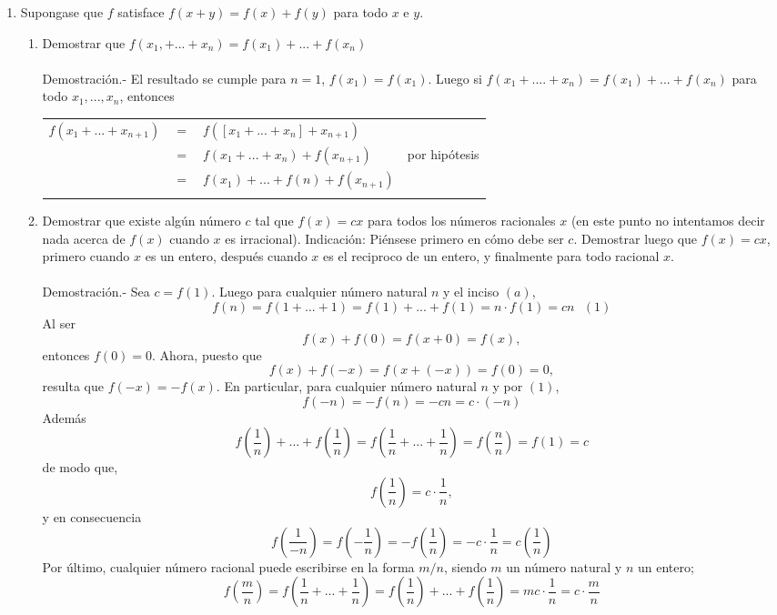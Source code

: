 \begin{enumerate}
\begin{enumerate}[\bfseries (a)]
	\end{enumerate}

	\item Supongase que $f$ satisface $f(x+y)=f(x)+f(y)$ para todo $x$ e $y$. 

	\begin{enumerate}[\bfseries (a)]

	    \item Demostrar que $f(x_1,+...+x_n)=f(x_1)+...+f(x_n)$\\\\
	    Demostración.-\; El resultado se cumple para $n=1$, $f(x_1)=f(x_1)$. Luego si $f(x_1 + .... + x_n)=f(x_1)+ ... + f(x_n)$ para todo $x_1,...,x_n$, entonces
	    \begin{center}
		\begin{tabular}{rcll}
		    $f(x_1 + ... + x_{n+1})$ & $=$ & $f(\left[x_1 + ... + x_n\right]+x_{n+1})$&\\
		       & $=$ & $f(x_1 + ... + x_n) + f(x_{n+1})$&por hipótesis\\
		       & $=$ & $f(x_1)+...+f(n)+f(x_{n+1})$&\\\\
		\end{tabular}
	    \end{center}

	    \item Demostrar que existe algún número $c$ tal que $f(x)=cx$ para todos los números racionales $x$ (en este punto no intentamos decir nada acerca de $f(x)$ cuando $x$ es irracional). Indicación: Piénsese primero en cómo debe ser $c$. Demostrar luego que $f(x)=cx$, primero cuando $x$ es un entero, después cuando $x$ es el reciproco de un entero, y finalmente para todo racional $x$.\\\\
	    Demostración.-\; Sea $c=f(1)$. Luego para cualquier número natural $n$ y el inciso $(a)$,  $$f(n)=f(1+...+1)=f(1)+...+f(1)=n\cdot f(1)=cn \,\,\,\, (1)$$ 
	    Al ser $$f(x)+f(0)=f(x+0)=f(x),$$ entonces $f(0)=0$. Ahora, puesto que $$f(x)+f(-x)=f(x+(-x))=f(0)=0,$$ 
	    resulta que $f(-x)=-f(x)$. En particular, para cualquier número natural $n$ y por $(1)$, $$f(-n)=-f(n)=-cn=c\cdot (-n)$$
	    Además $$f\left(\dfrac{1}{n}\right) + ... + f\left(\dfrac{1}{n}\right)=f\left(\dfrac{1}{n} + ... + \dfrac{1}{n}\right)=f\left( \dfrac{n}{n}\right)=f(1)=c$$ de modo que, $$f\left(\dfrac{1}{n}\right)=c\cdot \dfrac{1}{n},$$
	    y en consecuencia $$f\left(\dfrac{1}{-n}\right)=f\left(- \dfrac{1}{n}\right)=-f\left(\dfrac{1}{n}\right)=-c \cdot \dfrac{1}{n} = c \left(\dfrac{1}{n}\right)$$
	    Por último, cualquier número racional puede escribirse en la forma $m/n$, siendo $m$ un número natural y $n$ un entero;
	    $$f\left(\dfrac{m}{n}\right)=f\left(\dfrac{1}{n} + ... + \dfrac{1}{n}\right)=f\left(\dfrac{1}{n}\right) + ... + f\left(\dfrac{1}{n}\right)=mc\cdot \dfrac{1}{n}=c\cdot \dfrac{m}{n}$$\\\\


\end{enumerate}
\end{enumerate}
